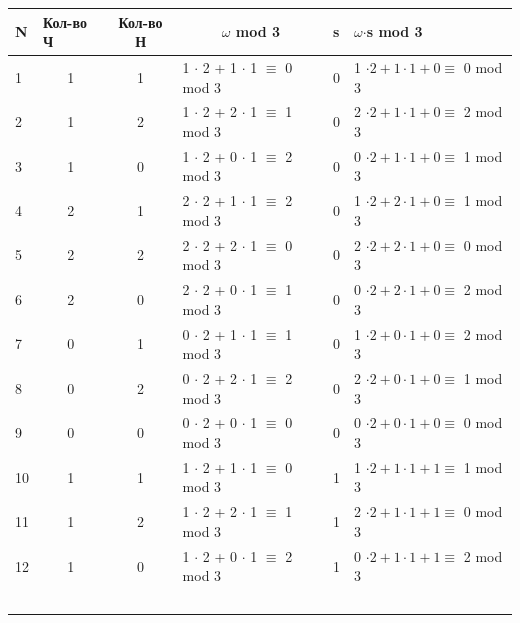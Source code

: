 \documentclass[a4paper,14pt]{article} %
\begin{document}
\begin{tabular}{|l|c|c|l|l|l|}
    \hline
    N  & \multicolumn{1}{l|}{Кол-во Ч} & Кол-во Н & \multicolumn{1}{c|}{$\omega$ mod 3} & s & $\omega$$\cdot$s mod 3            \\ \hline
    1  & 1                             & 1        & 1 $\cdot$ 2 + 1 $\cdot$ 1 $\equiv$ 0 mod 3            & 0 & 1 $\cdot 2+1 \cdot 1+0 \equiv$ 0 mod 3 \\ \hline
    2  & 1                             & 2        & 1 $\cdot$ 2 + 2 $\cdot$ 1 $\equiv$ 1 mod 3            & 0 & 2 $\cdot 2+1 \cdot 1+0 \equiv$ 2 mod 3 \\ \hline
    3  & 1                             & 0        & 1 $\cdot$ 2 + 0 $\cdot$ 1 $\equiv$ 2 mod 3            & 0 & 0 $\cdot 2+1 \cdot 1+0 \equiv$ 1 mod 3 \\ \hline
    4  & 2                             & 1        & 2 $\cdot$ 2 + 1 $\cdot$ 1 $\equiv$ 2 mod 3            & 0 & 1 $\cdot 2+2 \cdot 1+0 \equiv$ 1 mod 3 \\ \hline
    5  & 2                             & 2        & 2 $\cdot$ 2 + 2 $\cdot$ 1 $\equiv$ 0 mod 3            & 0 & 2 $\cdot 2+2 \cdot 1+0 \equiv$ 0 mod 3 \\ \hline
    6  & 2                             & 0        & 2 $\cdot$ 2 + 0 $\cdot$ 1 $\equiv$ 1 mod 3            & 0 & 0 $\cdot 2+2 \cdot 1+0 \equiv$ 2 mod 3 \\ \hline
    7  & 0                             & 1        & 0 $\cdot$ 2 + 1 $\cdot$ 1 $\equiv$ 1 mod 3            & 0 & 1 $\cdot 2+0 \cdot 1+0 \equiv$ 2 mod 3 \\ \hline
    8  & 0                             & 2        & 0 $\cdot$ 2 + 2 $\cdot$ 1 $\equiv$ 2 mod 3            & 0 & 2 $\cdot 2+0 \cdot 1+0 \equiv$ 1 mod 3 \\ \hline
    9  & 0                             & 0        & 0 $\cdot$ 2 + 0 $\cdot$ 1 $\equiv$ 0 mod 3            & 0 & 0 $\cdot 2+0 \cdot 1+0 \equiv$ 0 mod 3 \\ \hline
    10 & 1                             & 1        & 1 $\cdot$ 2 + 1 $\cdot$ 1 $\equiv$ 0 mod 3            & 1 & 1 $\cdot 2+1 \cdot 1+1 \equiv$ 1 mod 3 \\ \hline
    11 & 1                             & 2        & 1 $\cdot$ 2 + 2 $\cdot$ 1 $\equiv$ 1 mod 3            & 1 & 2 $\cdot 2+1 \cdot 1+1 \equiv$ 0 mod 3 \\ \hline
    12 & 1                             & 0        & 1 $\cdot$ 2 + 0 $\cdot$ 1 $\equiv$ 2 mod 3            & 1 & 0 $\cdot 2+1 \cdot 1+1 \equiv$ 2 mod 3 \\ \hline
$$
\end{tabular}
\end{document}
